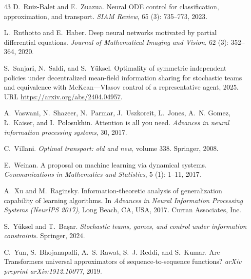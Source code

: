 \documentclass[11pt]{article}
\begin{document}
\begin{thebibliography}{43}
D.~Ruiz-Balet and E.~Zuazua.
\newblock Neural {ODE} control for classification, approximation, and transport.
\newblock \emph{SIAM Review}, 65 (3): 735--773, 2023.

L.~Ruthotto and E.~Haber.
\newblock Deep neural networks motivated by partial differential equations.
\newblock \emph{Journal of Mathematical Imaging and Vision}, 62 (3): 352--364, 2020.

S.~Sanjari, N.~Saldi, and S.~Yüksel.
\newblock Optimality of symmetric independent policies under decentralized mean-field information sharing for stochastic teams and equivalence with {McKean---Vlasov} control of a representative agent, 2025.
\newblock URL \url{https://arxiv.org/abs/2404.04957}.

A.~Vaswani, N.~Shazeer, N.~Parmar, J.~Uszkoreit, L.~Jones, A.~N. Gomez, {\L}.~Kaiser, and I.~Polosukhin.
\newblock Attention is all you need.
\newblock \emph{Advances in neural information processing systems}, 30, 2017.

C.~Villani.
\newblock \emph{Optimal transport: old and new}, volume 338.
\newblock Springer, 2008.

E.~Weinan.
\newblock A proposal on machine learning via dynamical systems.
\newblock \emph{Communications in Mathematics and Statistics}, 5 (1): 1--11, 2017.

A.~Xu and M.~Raginsky.
\newblock Information-theoretic analysis of generalization capability of learning algorithms.
\newblock In \emph{Advances in Neural Information Processing Systems (NeurIPS 2017)}, Long Beach, CA, USA, 2017. Curran Associates, Inc.

S.~Y{\"u}ksel and T.~Ba{\c{s}}ar.
\newblock \emph{Stochastic teams, games, and control under information constraints}.
\newblock Springer, 2024.

C.~Yun, S.~Bhojanapalli, A.~S. Rawat, S.~J. Reddi, and S.~Kumar.
\newblock Are {T}ransformers universal approximators of sequence-to-sequence functions?
\newblock \emph{arXiv preprint arXiv:1912.10077}, 2019.

\end{thebibliography}
\end{document}
